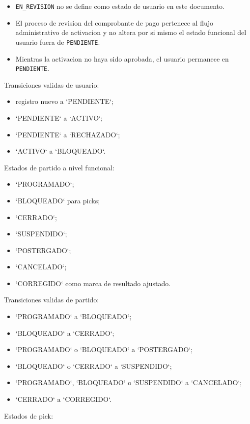 \begin{itemize}
  \item \texttt{EN\_REVISION} no se define como estado de usuario en este documento.
  \item El proceso de revision del comprobante de pago pertenece al flujo administrativo de activacion y no altera por si mismo el estado funcional del usuario fuera de \texttt{PENDIENTE}.
  \item Mientras la activacion no haya sido aprobada, el usuario permanece en \texttt{PENDIENTE}.
\end{itemize}

Transiciones validas de usuario:

\begin{itemize}
  \item registro nuevo a `PENDIENTE`;
  \item `PENDIENTE` a `ACTIVO`;
  \item `PENDIENTE` a `RECHAZADO`;
  \item `ACTIVO` a `BLOQUEADO`.
\end{itemize}

Estados de partido a nivel funcional:

\begin{itemize}
  \item `PROGRAMADO`;
  \item `BLOQUEADO` para picks;
  \item `CERRADO`;
  \item `SUSPENDIDO`;
  \item `POSTERGADO`;
  \item `CANCELADO`;
  \item `CORREGIDO` como marca de resultado ajustado.
\end{itemize}

Transiciones validas de partido:

\begin{itemize}
  \item `PROGRAMADO` a `BLOQUEADO`;
  \item `BLOQUEADO` a `CERRADO`;
  \item `PROGRAMADO` o `BLOQUEADO` a `POSTERGADO`;
  \item `BLOQUEADO` o `CERRADO` a `SUSPENDIDO`;
  \item `PROGRAMADO`, `BLOQUEADO` o `SUSPENDIDO` a `CANCELADO`;
  \item `CERRADO` a `CORREGIDO`.
\end{itemize}

Estados de pick:


